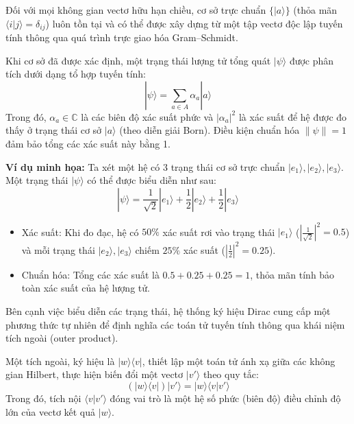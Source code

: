 \begin{remark} Đối với mọi không gian vectơ hữu hạn chiều, cơ sở trực chuẩn $\{|a\rangle\}$ (thỏa mãn $\langle i|j\rangle = \delta_{ij}$) luôn tồn tại và có thể được xây dựng từ một tập vectơ độc lập tuyến tính thông qua quá trình trực giao hóa Gram–Schmidt.
\end{remark}

\begin{proposition}
Khi cơ sở đã được xác định, một trạng thái lượng tử tổng quát $|\psi\rangle$ được phân tích dưới dạng tổ hợp tuyến tính: 
$$|\psi\rangle = \sum_{a \in A} \alpha_a |a\rangle$$ 
Trong đó, $\alpha_a \in \mathbb{C}$ là các biên độ xác suất phức và $|\alpha_a|^2$ là xác suất để hệ được đo thấy ở trạng thái cơ sở $|a\rangle$ (theo diễn giải Born). Điều kiện chuẩn hóa $\|\psi\| = 1$ đảm bảo tổng các xác suất này bằng 1.
\end{proposition}

\begin{framed}
\textbf{Ví dụ minh họa:} Ta xét một hệ có 3 trạng thái cơ sở trực chuẩn $|e_1\rangle, |e_2\rangle, |e_3\rangle$. Một trạng thái $|\psi\rangle$ có thể được biểu diễn như sau:
$$|\psi\rangle = \frac{1}{\sqrt{2}}|e_1\rangle + \frac{1}{2}|e_2\rangle + \frac{1}{2}|e_3\rangle$$
\begin{itemize}
    \item Xác suất: Khi đo đạc, hệ có $50\%$ xác suất rơi vào trạng thái $|e_1\rangle$ ($|\frac{1}{\sqrt{2}}|^2 = 0.5$) và mỗi trạng thái $|e_2\rangle, |e_3\rangle$ chiếm $25\%$ xác suất ($|\frac{1}{2}|^2 = 0.25$).
    \item Chuẩn hóa: Tổng các xác suất là $0.5 + 0.25 + 0.25 = 1$, thỏa mãn tính bảo toàn xác suất của hệ lượng tử.
\end{itemize}
\end{framed}

Bên cạnh việc biểu diễn các trạng thái, hệ thống ký hiệu Dirac cung cấp một phương thức tự nhiên để định nghĩa các toán tử tuyến tính thông qua khái niệm tích ngoài (outer product). 
\begin{definition} Một tích ngoài, ký hiệu là $|w\rangle\langle v|$, thiết lập một toán tử ánh xạ giữa các không gian Hilbert, thực hiện biến đổi một vectơ $|v'\rangle$ theo quy tắc:
$$(|w\rangle\langle v|)|v'\rangle = |w\rangle\langle v|v'\rangle$$
Trong đó, tích nội $\langle v|v'\rangle$ đóng vai trò là một hệ số phức (biên độ) điều chỉnh độ lớn của vectơ kết quả $|w\rangle$.
\end{definition}

